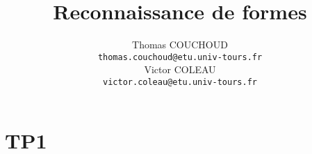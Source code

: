 \documentclass{report}
\title{Reconnaissance de formes}
\author{Thomas COUCHOUD\\\texttt{thomas.couchoud@etu.univ-tours.fr}\\Victor COLEAU\\\texttt{victor.coleau@etu.univ-tours.fr}}
\begin{document}
	\mccTitle
	\chapter{TP1}
		
\end{document}
